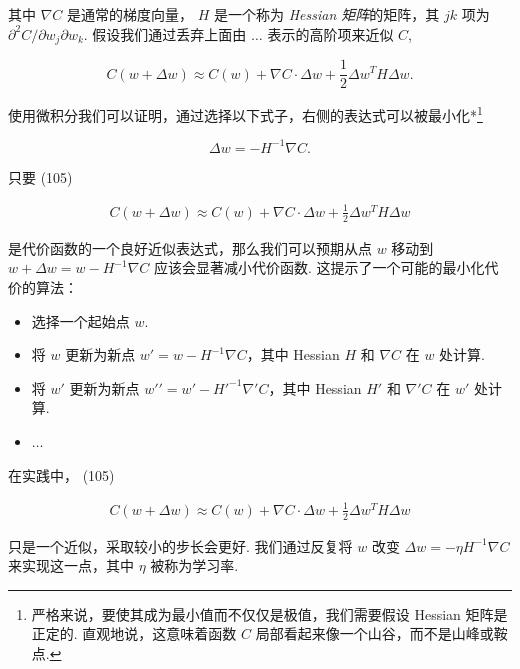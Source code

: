 \noindent 其中 $\nabla C$ 是通常的梯度向量， $H$ 是一个称为 \emph{Hessian 矩阵}的矩阵，其 $jk$ 项为 $\partial^2 C / \partial w_j \partial w_k$. 假设我们通过丢弃上面由 $\ldots$ 表示的高阶项来近似 $C$,

\begin{equation}
C(w+\Delta w) \approx C(w) + \nabla C \cdot \Delta w + \frac{1}{2} \Delta w^T H \Delta w.
\tag{105}
\end{equation}

\noindent 使用微积分我们可以证明，通过选择以下式子，右侧的表达式可以被最小化*\footnote{严格来说，要使其成为最小值而不仅仅是极值，我们需要假设 Hessian 矩阵是正定的. 直观地说，这意味着函数 $C$ 局部看起来像一个山谷，而不是山峰或鞍点.}

\begin{equation}
\Delta w = -H^{-1} \nabla C.
\tag{106}
\end{equation}

\noindent 只要 (105)

\begin{align*}
C(w+\Delta w) \approx C(w) + \nabla C \cdot \Delta w + \frac{1}{2} \Delta w^T H \Delta w \nonumber
\end{align*}

\noindent 是代价函数的一个良好近似表达式，那么我们可以预期从点 $w$ 移动到 $w+\Delta w = w-H^{-1} \nabla C$ 应该会显著减小代价函数. 这提示了一个可能的最小化代价的算法：

\begin{itemize}

\item 选择一个起始点 $w$.

\item 将 $w$ 更新为新点 $w' = w-H^{-1} \nabla C$，其中 Hessian $H$ 和 $\nabla C$ 在 $w$ 处计算.

\item 将 $w'$ 更新为新点 $w{'}{'} = w'-H'^{-1} \nabla' C$，其中 Hessian $H'$ 和 $\nabla' C$ 在 $w'$ 处计算.

\item $\ldots$

\end{itemize}

在实践中， (105)

\begin{align*}
C(w+\Delta w) \approx C(w) + \nabla C \cdot \Delta w + \frac{1}{2} \Delta w^T H \Delta w \nonumber
\end{align*}

\noindent 只是一个近似，采取较小的步长会更好. 我们通过反复将 $w$ 改变 $\Delta w = -\eta H^{-1} \nabla C$ 来实现这一点，其中 $\eta$ 被称为学习率.

